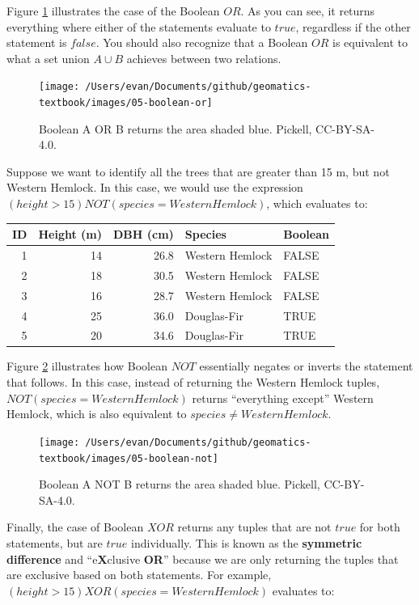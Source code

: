 \documentclass[
]{book}
\begin{document}
Figure \ref{fig:5-boolean-or} illustrates the case of the Boolean \(OR\). As you can see, it returns everything where either of the statements evaluate to \(true\), regardless if the other statement is \(false\). You should also recognize that a Boolean \(OR\) is equivalent to what a set union \(A∪B\) achieves between two relations.

\begin{figure}
\texttt{[image: /Users/evan/Documents/github/geomatics-textbook/images/05-boolean-or]} \caption{Boolean A OR B returns the area shaded blue. Pickell, CC-BY-SA-4.0.}\label{fig:5-boolean-or}
\end{figure}

Suppose we want to identify all the trees that are greater than 15 m, but not Western Hemlock. In this case, we would use the expression \((height>15)NOT(species=WesternHemlock)\), which evaluates to:

\begin{tabular}{rrrll}
\toprule
ID & Height (m) & DBH (cm) & Species & Boolean\\
\midrule
1 & 14 & 26.8 & Western Hemlock & FALSE\\
2 & 18 & 30.5 & Western Hemlock & FALSE\\
3 & 16 & 28.7 & Western Hemlock & FALSE\\
4 & 25 & 36.0 & Douglas-Fir & TRUE\\
5 & 20 & 34.6 & Douglas-Fir & TRUE\\
\bottomrule
\end{tabular}

Figure \ref{fig:5-boolean-not} illustrates how Boolean \(NOT\) essentially negates or inverts the statement that follows. In this case, instead of returning the Western Hemlock tuples, \(NOT(species=WesternHemlock)\) returns ``everything except'' Western Hemlock, which is also equivalent to \(species≠WesternHemlock\).

\begin{figure}
\texttt{[image: /Users/evan/Documents/github/geomatics-textbook/images/05-boolean-not]} \caption{Boolean A NOT B returns the area shaded blue. Pickell, CC-BY-SA-4.0.}\label{fig:5-boolean-not}
\end{figure}

Finally, the case of Boolean \(XOR\) returns any tuples that are not \(true\) for both statements, but are \(true\) individually. This is known as the \textbf{symmetric difference} and ``e\textbf{X}clusive \textbf{OR}'' because we are only returning the tuples that are exclusive based on both statements. For example, \((height>15)XOR(species=WesternHemlock)\) evaluates to:
\end{document}
